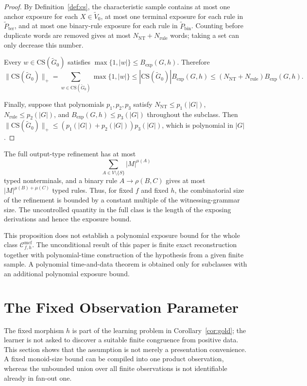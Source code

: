 \documentclass[11pt,a4paper]{article}
\theoremstyle{remark}
\newcommand{\CS}{\mathrm{CS}}
\newcommand{\Cmcf}[2]{\mathcal{C}^{\mathrm{mcf}}_{#1,#2}}
\begin{document}
\begin{proof}
By Definition~\ref{def:cs}, the characteristic sample contains at most one
anchor exposure for each \(X\in\widetilde V_0\), at most one terminal exposure
for each rule in \(\widetilde P_{\mathrm{ter}}\), and at most one binary-rule
exposure for each rule in \(\widetilde P_{\mathrm{bin}}\).  Counting before
duplicate words are removed gives at most
\(N_{\mathrm{NT}}+N_{\mathrm{rule}}\) words; taking a set can only decrease
this number.

Every \(w\in\CS(\widetilde G_0)\) satisfies
\(\max\{1,|w|\}\le B_{\mathrm{exp}}(G,h)\).  Therefore
\[
  \|\CS(\widetilde G_0)\|_+
  =\sum_{w\in\CS(\widetilde G_0)}\max\{1,|w|\}
  \le |\CS(\widetilde G_0)|B_{\mathrm{exp}}(G,h)
  \le (N_{\mathrm{NT}}+N_{\mathrm{rule}})B_{\mathrm{exp}}(G,h).
\]

Finally, suppose that polynomials \(p_1,p_2,p_3\) satisfy
\(N_{\mathrm{NT}}\le p_1(|G|)\),
\(N_{\mathrm{rule}}\le p_2(|G|)\), and
\(B_{\mathrm{exp}}(G,h)\le p_3(|G|)\) throughout the subclass.  Then
\(\|\CS(\widetilde G_0)\|_+\le
(p_1(|G|)+p_2(|G|))p_3(|G|)\), which is polynomial in \(|G|\).
\end{proof}

The full output-type refinement has at most
\[
  \sum_{A\in V\setminus\{S\}} |M|^{\mu(A)}
\]
typed nonterminals, and a binary rule \(A\to\rho(B,C)\) gives at most
\(|M|^{\mu(B)+\mu(C)}\) typed rules.  Thus, for fixed \(f\) and fixed \(h\),
the combinatorial size of the refinement is bounded by a constant multiple of
the witnessing-grammar size.  The uncontrolled quantity in the full class is
the length of the exposing derivations and hence the exposure bound.

This proposition does not establish a polynomial exposure bound for the whole
class \(\Cmcf{f}{h}\).  The unconditional result of this paper is finite exact
reconstruction together with polynomial-time construction of the hypothesis
from a given finite sample.  A polynomial time-and-data theorem is obtained
only for subclasses with an additional polynomial exposure bound.


\section{The Fixed Observation Parameter}
\label{sec:fixed-observation}

The fixed morphism \(h\) is part of the learning problem in
Corollary~\ref{cor:gold}; the learner is not asked to discover a suitable
finite congruence from positive data.  This section shows that the assumption is
not merely a presentation convenience.  A fixed monoid-size bound can be
compiled into one product observation, whereas the unbounded union over all
finite observations is not identifiable already in fan-out one.
\end{document}
